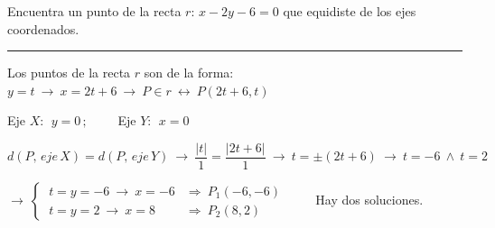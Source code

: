 \begin{miejercicio}

Encuentra un punto de la recta $r:\, x-2y-6=0$ que equidiste de los ejes coordenados.

\rule{250pt}{0.1pt}

\vspace{2mm} Los puntos de la recta $r$ son de la forma: $y=t \ \to \ x=2t+6 \ \to \ 	P\in r \ \leftrightarrow \ P(2t+6,t)$

\vspace{2mm} Eje $X:\ \ y=0 \, ; \qquad $ Eje $Y:\ \  x=0$

\vspace{2mm} $d(P,\, eje\, X)=d(P,\, eje\, Y) \ \to \ \dfrac{|t|}{1}=\dfrac{|2t+6|}{1} \ \to \ t=\pm(2t+6) \ \to \ t=-6 \ \wedge \ t=2$

\vspace{3mm} $\to \ \begin{cases} \ t=y=-6  \ \to \ x=-6 &\Rightarrow \ P_1(-6,-6) \\ \  t=y=2  \ \to \ x=8 &\Rightarrow \ P_2(8,2) \end{cases}\qquad$  Hay dos soluciones.

\end{miejercicio}

